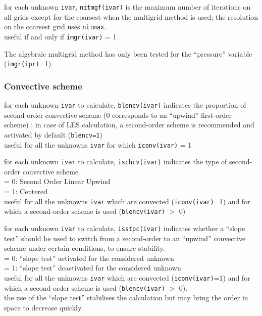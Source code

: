 {for each unknown {\tt ivar}, {\tt nitmgf(ivar)} is the maximum number of
iterations on all grids except for the coarsest when the multigrid method is
used; the resolution on the coarsest grid uses {\tt nitmax}.\\
useful if and only if {\tt imgr(ivar)} = 1}

The algebraic multigrid method has only been tested for
the ``pressure'' variable ({\tt imgr(ipr)}=1).

\subsubsection{Convective scheme}

{for each unknown {\tt ivar} to calculate, {\tt blencv(ivar)} indicates the
 proportion of second-order convective scheme (0 corresponds to an
``upwind'' first-order scheme) ; in case of LES calculation, a
second-order scheme is recommended and activated by default ({\tt blencv=1})\\
useful for all the unknowns {\tt ivar} for which {\tt iconv(ivar)} = 1}

{for each unknown {\tt ivar} to calculate, {\tt ischcv(ivar)} indicates the type of second-order
convective scheme\\
\hspace*{1.3cm}= 0: Second Order Linear Upwind\\
\hspace*{1.3cm}= 1: Centered\\
useful for all the unknowns {\tt ivar} which are convected
({\tt iconv(ivar)}=1) and
for which a second-order scheme is used ({\tt blencv(ivar)} $>$ 0)}

{for each unknown {\tt ivar} to calculate, {\tt isstpc(ivar)}
indicates whether a ``slope test'' should
be used to switch from a second-order to an ``upwind'' convective
scheme under certain conditions, to ensure stability.\\
\hspace*{1.3cm}= 0: ``slope test'' activated for the considered unknown\\
\hspace*{1.3cm}= 1: ``slope test'' deactivated for the considered unknown\\
useful for all the unknowns {\tt ivar}  which are convected
({\tt iconv(ivar)}=1) and
for which a second-order scheme is used ({\tt blencv(ivar)} $>$ 0).\\
the use of the ``slope test'' stabilises the calculation but may bring
the order in space to decrease quickly.}

